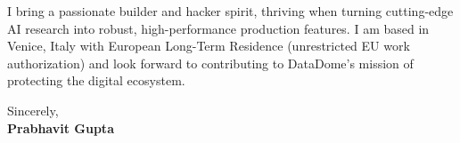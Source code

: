 \documentclass[11pt,a4paper]{article}
\begin{document}
\vspace{6pt}

\noindent I bring a passionate builder and hacker spirit, thriving when turning cutting-edge AI research into robust, high-performance production features. I am based in Venice, Italy with European Long-Term Residence (unrestricted EU work authorization) and look forward to contributing to DataDome's mission of protecting the digital ecosystem.

\vspace{12pt}

\noindent Sincerely, \\
\textbf{Prabhavit Gupta}
\end{document}

